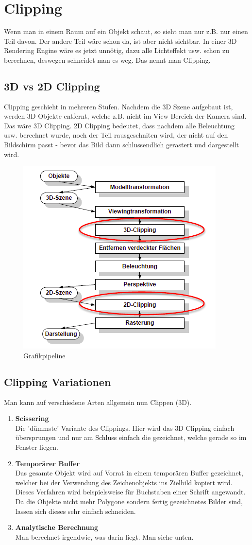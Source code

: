 \chapter{Clipping}

Wenn man in einem Raum auf ein Objekt schaut, so sieht man nur z.B. nur einen Teil davon. Der andere Teil wäre schon da, ist aber nicht sichtbar. In einer 3D Rendering Engine wäre es jetzt unnötig, dazu alle Lichteffekt usw. schon zu berechnen, deswegen schneidet man es weg. Das nennt man Clipping.

\section{3D vs 2D Clipping}
Clipping geschieht in mehreren Stufen. Nachdem die 3D Szene aufgebaut ist, werden 3D Objekte entfernt, welche z.B. nicht im View Bereich der Kamera sind. Das wäre 3D Clipping. 2D Clipping bedeutet, dass nachdem alle Beleuchtung usw. berechnet wurde, noch der Teil rausgeschniten wird, der nicht auf den Bildschirm passt - bevor das Bild dann schlussendlich gerastert und dargestellt wird.
\begin{figure}[!ht]
	\centering
	\includegraphics[width=0.4\linewidth]{fig/grafikpipeline}
	\caption{Grafikpipeline}
	\label{fig:grafikpipeline}
\end{figure}

\section{Clipping Variationen}
Man kann auf verschiedene Arten allgemein nun Clippen (3D).
\begin{enumerate}
	\item \textbf{Scissering} \\
	Die 'dümmste' Variante des Clippings. Hier wird das 3D Clipping einfach übersprungen und nur am Schluss einfach die gezeichnet, welche gerade so im Fenster liegen.
	\item \textbf{Temporärer Buffer} \\
	Das gesamte Objekt wird auf Vorrat in einem temporären Buffer gezeichnet, welcher bei der Verwendung des Zeichenobjekts ins Zielbild kopiert wird. 
	Dieses Verfahren wird beispielsweise für Buchstaben einer Schrift angewandt. Da die Objekte nicht mehr Polygone sondern fertig gezeichnetes Bilder sind, lassen sich dieses sehr einfach schneiden.
	\item \textbf{Analytische Berechnung} \\ 
	Man berechnet irgendwie, was darin liegt. Man siehe unten.
\end{enumerate}


